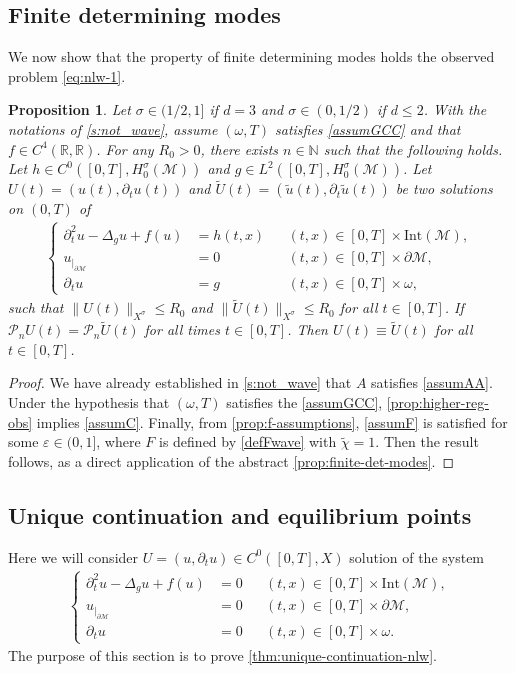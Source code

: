 \documentclass[JEP,XML,SOM,Unicode,published]{cedram}
\newtheorem{proposition}[theorem]{Proposition}
\theoremstyle{definition}
\let\mc\mathcal
\let\veps\varepsilon
\newcommand{\M}{\mc{M}}
\newcommand{\R}{\mathbb{R}}
\newcommand{\N}{\mathbb{N}}
\renewcommand{\P}{\mathcal{P}}
\providecommand{\norm}[1]{\lVert#1\rVert}
\begin{document}
\subsection{Finite determining modes} We now show that the property of finite determining modes holds the observed problem \eqref{eq:nlw-1}.
\begin{proposition}
\label{propfinitedetwave}
Let $\sigma\in (1/2, 1]$ if $d=3$ and $\sigma\in (0,1/2)$ if $d\leq 2$. With the notations of \cref{s:not_wave}, assume $(\omega, T)$ satisfies \ref{assumGCC} and that $f\in C^4(\R, \R)$. For any $R_0>0$, there exists $n\in \N$ such that the following holds. Let $h\in C^0([0,T], H_0^{\sigma}(\M))$ and $g\in L^2([0, T], H_0^\sigma(\M))$. Let $U(t)=(u(t),\partial_t u(t))$ and $\widetilde{U}(t)=(\tilde{u}(t), \partial_t\tilde{u}(t))$ be two solutions on $(0,T)$ of\vspace*{-3pt}
\begin{align}\label{eq:nlw-uc_source}
\left\{\begin{aligned}
\partial_t^2 u-\Delta_g u+f(u)&=h(t, x) &&(t, x)\in [0, T]\times \text{Int}(\M),\\
u_{|_{\partial\M}}&=0 &&(t, x)\in [0, T]\times\partial\M,\\
\partial_t u&=g &&(t, x)\in [0, T]\times \omega,
\end{aligned}\right.
\end{align}
such that $\norm{U(t)}_{X^\sigma}\leq R_{0}$ and $\norm{\widetilde{U}(t)}_{X^\sigma}\leq R_{0}$ for all $t\in [0, T]$. If $\P_n U(t)=\P_n \widetilde{U}(t)$ for all times $t\in [0, T]$. Then $U(t)\equiv \widetilde{U}(t)$ for all $t\in [0, T]$.
\end{proposition}
\begin{proof}
We have already established in \cref{s:not_wave} that $A$ satisfies \cref{assumAA}. Under the hypothesis that $(\omega, T)$ satisfies the \ref{assumGCC}, \cref{prop:higher-reg-obs} implies \cref{assumC}. Finally, from \cref{prop:f-assumptions}, \cref{assumF} is satisfied for some $\veps\in (0, 1]$, where $F$ is defined by \eqref{defFwave} with $\widetilde{\chi}=1$. Then the result follows, as a direct application of the abstract \cref{prop:finite-det-modes}.
\end{proof}

\subsection{Unique continuation and equilibrium points} Here we will consider $U=(u, \partial_t u)\in C^0([0, T], X)$ solution of the system\vspace*{-3pt}
\begin{align}\label{eq:nlw-uc}
\left\{\begin{aligned}
\partial_t^2 u-\Delta_g u+f(u)&=0 &&(t, x)\in [0, T]\times \text{Int}(\M),\\
u_{|_{\partial\M}}&=0 &&(t, x)\in [0, T]\times\partial\M,\\
\partial_t u&=0 &&(t, x)\in [0, T]\times \omega.
\end{aligned}\right.
\end{align}
The purpose of this section is to prove \cref{thm:unique-continuation-nlw}.
\end{document}
